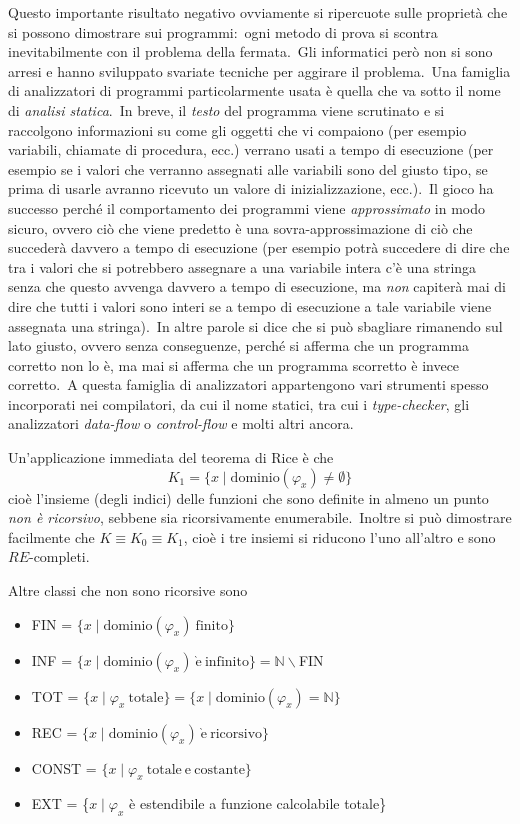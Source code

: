 \noindent Questo importante risultato negativo ovviamente si ripercuote sulle proprietà che si possono dimostrare sui programmi:\ ogni metodo di prova si scontra inevitabilmente con il problema della fermata.\
Gli informatici però non si sono arresi e hanno sviluppato svariate tecniche per aggirare il problema.\
Una famiglia di analizzatori di programmi particolarmente usata è quella che va sotto il nome di \textit{analisi statica}.\
In breve, il \textit{testo} del programma viene scrutinato e si raccolgono informazioni su come gli oggetti che vi compaiono (per esempio variabili, chiamate di procedura, ecc.) verrano usati a tempo di esecuzione (per esempio se i valori che verranno assegnati alle variabili sono del giusto tipo, se prima di usarle avranno ricevuto un valore di inizializzazione, ecc.).\
Il gioco ha successo perché il comportamento dei programmi viene \textit{approssimato} in modo sicuro, ovvero ciò che viene predetto è una sovra-approssimazione di ciò che succederà davvero a tempo di esecuzione (per esempio potrà succedere di dire che tra i valori che si potrebbero assegnare a una variabile intera c'è una stringa senza che questo avvenga davvero a tempo di esecuzione, ma \textit{non} capiterà mai di dire che tutti i valori sono interi se a tempo di esecuzione a tale variabile viene assegnata una stringa).\
In altre parole si dice che si può sbagliare rimanendo sul lato giusto, ovvero senza conseguenze, perché si afferma che un programma corretto non lo è, ma mai si afferma che un programma scorretto è invece corretto.\
A questa famiglia di analizzatori appartengono vari strumenti spesso incorporati nei compilatori, da cui il nome statici, tra cui i \textit{type-checker}, gli analizzatori \textit{data-flow} o \textit{control-flow} e molti altri ancora.

\medskip
\noindent Un'applicazione immediata del teorema di Rice è che
\[K_1 = \{x \mid \mathrm{dominio}(\varphi_x) \neq \emptyset\}\]
cioè l'insieme (degli indici) delle funzioni che sono definite in almeno un punto \textit{non è ricorsivo}, sebbene sia ricorsivamente enumerabile.\
Inoltre si può dimostrare facilmente che $K \equiv K_0 \equiv K_1$, cioè i tre insiemi si riducono l'uno all'altro e sono $RE$-completi.

Altre classi che non sono ricorsive sono
\begin{itemize}
    \item[] {\footnotesize FIN} = $\{x \mid \mathrm{dominio}(\varphi_x)\ \mathrm{finito}\}$
    \item[] {\footnotesize INF} = $\{x \mid \mathrm{dominio}(\varphi_x)\ \mathrm{\grave{e}\ infinito}\} = \mathbb{N}\backslash${\footnotesize FIN}
    \item[] {\footnotesize TOT} = $\{x \mid \varphi_x\ \mathrm{totale}\} = \{x \mid \mathrm{dominio}(\varphi_x) = \mathbb{N}\}$
    \item[] {\footnotesize REC} = $\{x \mid \mathrm{dominio}(\varphi_x)\ \mathrm{\grave{e}\ ricorsivo}\}$
    \item[] {\footnotesize CONST} = $\{x \mid \varphi_x\ \mathrm{totale\ e\ costante}\}$
    \item[] {\footnotesize EXT} = \{$x \mid \varphi_x$ è estendibile a funzione calcolabile totale\}
\end{itemize}


